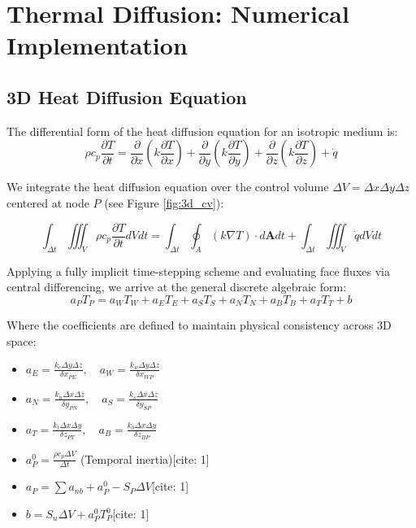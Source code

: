  \chapter{Thermal Diffusion: Numerical Implementation}

\section{3D Heat Diffusion Equation}

The differential form of the heat diffusion equation for an isotropic medium is:
\begin{equation}
    \rho c_p \frac{\partial T}{\partial t} = \frac{\partial}{\partial x}\left( k \frac{\partial T}{\partial x} \right) + \frac{\partial}{\partial y}\left( k \frac{\partial T}{\partial y} \right) + \frac{\partial}{\partial z}\left( k \frac{\partial T}{\partial z} \right) + \dot{q}
\end{equation}

We integrate the heat diffusion equation over the control volume $\Delta V = \Delta x \Delta y \Delta z$ centered at node $P$ (see Figure \ref{fig:3d_cv}):

\begin{equation}
    \int_{\Delta t} \iiint_V \rho c_p \frac{\partial T}{\partial t} dV dt = \int_{\Delta t} \oint_A (k \nabla T) \cdot d\mathbf{A} dt + \int_{\Delta t} \iiint_V \dot{q} dV dt
\end{equation}

Applying a fully implicit time-stepping scheme and evaluating face fluxes via central differencing, we arrive at the general discrete algebraic form:
\begin{equation}
    a_P T_P = a_W T_W + a_E T_E + a_S T_S + a_N T_N + a_B T_B + a_T T_T + b
\end{equation}

Where the coefficients are defined to maintain physical consistency across 3D space:
\begin{itemize}
    \item $a_E = \frac{k_e \Delta y \Delta z}{\delta x_{PE}}, \quad a_W = \frac{k_w \Delta y \Delta z}{\delta x_{WP}}$
    \item $a_N = \frac{k_n \Delta x \Delta z}{\delta y_{PN}}, \quad a_S = \frac{k_s \Delta x \Delta z}{\delta y_{SP}}$
    \item $a_T = \frac{k_t \Delta x \Delta y}{\delta z_{PT}}, \quad a_B = \frac{k_b \Delta x \Delta y}{\delta z_{BP}}$
    \item $a_P^0 = \frac{\rho c_p \Delta V}{\Delta t}$ (Temporal inertia)[cite: 1]
    \item $a_P = \sum a_{nb} + a_P^0 - S_P \Delta V$[cite: 1]
    \item $b = S_u \Delta V + a_P^0 T_P^0$[cite: 1]
\end{itemize}

